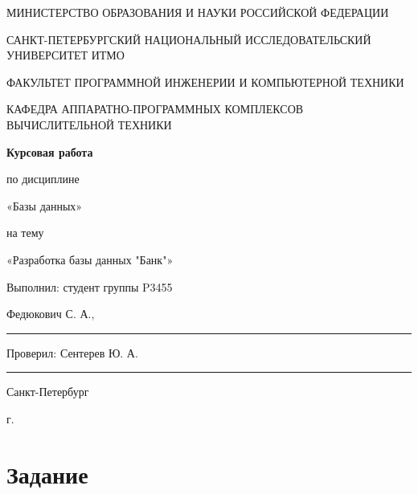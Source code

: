 \documentclass[14pt]{extarticle}
\begin{document}
    \thispagestyle{empty}
    \begin{center}
        МИНИСТЕРСТВО ОБРАЗОВАНИЯ И НАУКИ РОССИЙСКОЙ ФЕДЕРАЦИИ

        САНКТ-ПЕТЕРБУРГСКИЙ НАЦИОНАЛЬНЫЙ ИССЛЕДОВАТЕЛЬСКИЙ УНИВЕРСИТЕТ ИТМО

        ФАКУЛЬТЕТ ПРОГРАММНОЙ ИНЖЕНЕРИИ И КОМПЬЮТЕРНОЙ ТЕХНИКИ

        КАФЕДРА АППАРАТНО-ПРОГРАММНЫХ КОМПЛЕКСОВ ВЫЧИСЛИТЕЛЬНОЙ ТЕХНИКИ

        \vspace{2cm}

        \textbf{Курсовая работа}

        по дисциплине

        «Базы данных»

        на тему

        «Разработка базы данных "Банк"»

        \vspace{2cm}

        \begin{flushright}
            Выполнил: студент группы P3455

            Федюкович С. А.,\par
            \rule[0.66\baselineskip]{3cm}{0.4pt}

            \par

            Проверил: Сентерев Ю. А.

            \par\par

            \rule[0.66\baselineskip]{3cm}{0.4pt}
        \end{flushright}

        \vspace*{\fill}

        Санкт-Петербург

        \the\year г.
    \end{center}

    \newpage
    \restoregeometry
    \pagestyle{plain}
    \setcounter{page}{1}

    \tableofcontents

    \newpage

    \section*{Задание}
\end{document}
